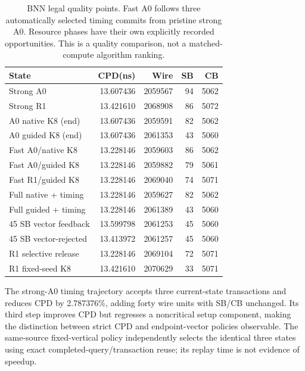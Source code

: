 \documentclass[conference,10pt]{IEEEtran}
\begin{document}
\begin{table}[t]
\centering\caption{BNN legal quality points. Fast A0 follows three automatically selected timing commits from pristine strong A0. Resource phases have their own explicitly recorded opportunities. This is a quality comparison, not a matched-compute algorithm ranking.}
\label{tab:bnn}
\small
\begin{tabular}{lrrrr}\hline
State & CPD(ns) & Wire & SB & CB\\\hline
Strong A0 &13.607436&2059567&94&5062\\
Strong R1 &13.421610&2068908&86&5072\\
A0 native K8 (end) &13.607436&2059591&82&5062\\
A0 guided K8 (end) &13.607436&2061353&43&5060\\
Fast A0/native K8 &13.228146&2059603&86&5062\\
Fast A0/guided K8 &13.228146&2059882&79&5061\\
Fast R1/guided K8 &13.228146&2069040&74&5071\\
Full native + timing &13.228146&2059627&82&5062\\
Full guided + timing &13.228146&2061389&43&5060\\
45 SB vector feedback &13.599798&2061253&45&5060\\
45 SB vector-rejected &13.413972&2061257&45&5060\\
R1 selective release &13.228146&2069104&72&5071\\
R1 fixed-seed K8 &13.421610&2070629&33&5071\\\hline
\end{tabular}
\end{table}
The strong-A0 timing trajectory accepts three current-state transactions and reduces CPD by 2.787376\%, adding forty wire units with SB/CB unchanged. Its third step improves CPD but regresses a noncritical setup component, making the distinction between strict CPD and endpoint-vector policies observable. The same-source fixed-vertical policy independently selects the identical three states using exact completed-query/transaction reuse; its replay time is not evidence of speedup.
\end{document}
